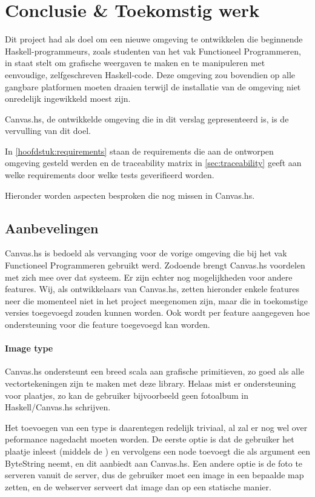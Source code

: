 \chapter{Conclusie \& Toekomstig werk} \label{hoofdstuk:conclusie}
Dit project had als doel om een nieuwe omgeving te ontwikkelen die beginnende Haskell-programmeurs, zoals studenten van het vak Functioneel Programmeren, in staat stelt om grafische weergaven te maken en te manipuleren met eenvoudige, zelfgeschreven Haskell-code. Deze omgeving zou bovendien op alle gangbare platformen moeten draaien terwijl de installatie van de omgeving niet onredelijk ingewikkeld moest zijn.

Canvas.hs, de ontwikkelde omgeving die in dit verslag gepresenteerd is, is de vervulling van dit doel. 

In \autoref{hoofdstuk:requirements} staan de requirements die aan de ontworpen omgeving gesteld werden en de traceability matrix in \autoref{sec:traceability} geeft aan welke requirements door welke tests geverifieerd worden.


Hieronder worden aspecten besproken die nog missen in Canvas.hs. 

\section{Aanbevelingen} \label{sec:aanbevelingen}
Canvas.hs is bedoeld als vervanging voor de vorige omgeving die bij het vak Functioneel Programmeren gebruikt werd. Zodoende brengt Canvas.hs voordelen met zich mee over dat systeem. Er zijn echter nog mogelijkheden voor andere features. Wij, als ontwikkelaars van Canvas.hs, zetten hieronder enkele features neer die momenteel niet in het project meegenomen zijn, maar die in toekomstige versies toegevoegd zouden kunnen worden. Ook wordt per feature aangegeven hoe ondersteuning voor die feature toegevoegd kan worden.

\subsubsection{Image type}
Canvas.hs ondersteunt een breed scala aan grafische primitieven, zo goed als alle vectortekeningen zijn te maken met deze library. Helaas mist er ondersteuning voor plaatjes, zo kan de gebruiker bijvoorbeeld geen fotoalbum in Haskell/Canvas.hs schrijven.

Het toevoegen van een  type is daarentegen redelijk triviaal, al zal er nog wel over peformance nagedacht moeten worden. De eerste optie is dat de gebruiker het plaatje inleest (middels de ) en vervolgens een  node toevoegt die als argument een ByteString neemt, en dit aanbiedt aan Canvas.hs. Een andere optie is de foto te serveren vanuit de server, dus de gebruiker moet een image in een bepaalde map zetten, en de webserver serveert dat image dan op een statische manier.

